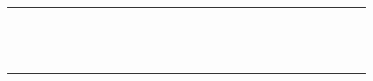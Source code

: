 \documentclass[10pt]{article}
\begin{document}
\begin{center}
\begin{tabular}{|c|c|c|c|c|c|c|c|c|c|c|c|c|c|c|c|c|c|c|c|c|c|c|c|c|c|c|c|c|}
\hline
 &  &  &  &  &  &  &  &  &  &  &  &  &  &  &  &  &  &  &  &  &  &  &  &  &  &  &  &  \\
\hline
 &  &  &  &  &  &  &  &  &  &  &  &  &  &  &  &  &  &  &  &  &  &  &  &  &  &  &  &  \\
\hline
 &  &  &  &  &  &  &  &  &  &  &  &  &  &  &  &  &  &  &  &  &  &  &  &  &  &  &  &  \\
\hline
 &  &  &  &  &  &  &  &  &  &  &  &  &  &  &  &  &  &  &  &  &  &  &  &  &  &  &  &  \\
\hline
 &  &  &  &  &  &  &  &  &  &  &  &  &  &  &  &  &  &  &  &  &  &  &  &  &  &  &  &  \\
\hline
 &  &  &  &  &  &  &  &  &  &  &  &  &  &  &  &  &  &  &  &  &  &  &  &  &  &  &  &  \\
\hline
 &  &  &  &  &  &  &  &  &  &  &  &  &  &  &  &  &  &  &  &  &  &  &  &  &  &  &  &  \\
\hline
 &  &  &  &  &  &  &  &  &  &  &  &  &  &  &  &  &  &  &  &  &  &  &  &  &  &  &  &  \\
\hline
 &  &  &  &  &  &  &  &  &  &  &  &  &  &  &  &  &  &  &  &  &  &  &  &  &  &  &  &  \\
\hline
 &  &  &  &  &  &  &  &  &  &  &  &  &  &  &  &  &  &  &  &  &  &  &  &  &  &  &  &  \\
\hline
 &  &  &  &  &  &  &  &  &  &  &  &  &  &  &  &  &  &  &  &  &  &  &  &  &  &  &  &  \\
\hline
 &  &  &  &  &  &  &  &  &  &  &  &  &  &  &  &  &  &  &  &  &  &  &  &  &  &  &  &  \\
\hline
 &  &  &  &  &  &  &  &  &  &  &  &  &  &  &  &  &  &  &  &  &  &  &  &  &  &  &  &  \\
\hline
 &  &  &  &  &  &  &  &  &  &  &  &  &  &  &  &  &  &  &  &  &  &  &  &  &  &  &  &  \\
\hline
 &  &  &  &  &  &  &  &  &  &  &  &  &  &  &  &  &  &  &  &  &  &  &  &  &  &  &  &  \\
\hline

\end{tabular}
\end{center}
\end{document}
